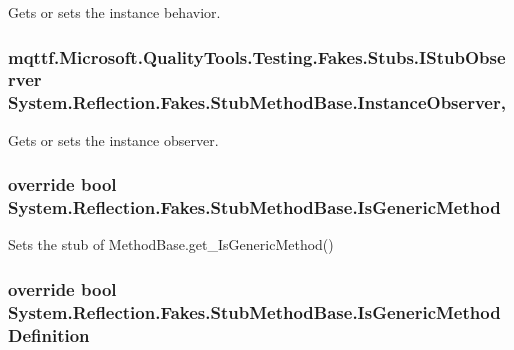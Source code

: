 Gets or sets the instance behavior.

\hypertarget{class_system_1_1_reflection_1_1_fakes_1_1_stub_method_base_a9e28b2aeb90b5c9c6df565e5b5fa22e6}{
\subsubsection[{Instance\-Observer}]{\setlength{\rightskip}{0pt plus 5cm}mqttf.\-Microsoft.\-Quality\-Tools.\-Testing.\-Fakes.\-Stubs.\-I\-Stub\-Observer System.\-Reflection.\-Fakes.\-Stub\-Method\-Base.\-Instance\-Observer\hspace{0.3cm}{\ttfamily [get]}, {\ttfamily [set]}}}\label{class_system_1_1_reflection_1_1_fakes_1_1_stub_method_base_a9e28b2aeb90b5c9c6df565e5b5fa22e6}


Gets or sets the instance observer.

\hypertarget{class_system_1_1_reflection_1_1_fakes_1_1_stub_method_base_aa01f57ba6382d6aca5e79fa6ad302a6d}{
\subsubsection[{Is\-Generic\-Method}]{\setlength{\rightskip}{0pt plus 5cm}override bool System.\-Reflection.\-Fakes.\-Stub\-Method\-Base.\-Is\-Generic\-Method\hspace{0.3cm}{\ttfamily [get]}}}\label{class_system_1_1_reflection_1_1_fakes_1_1_stub_method_base_aa01f57ba6382d6aca5e79fa6ad302a6d}


Sets the stub of Method\-Base.\-get\-\_\-\-Is\-Generic\-Method()

\hypertarget{class_system_1_1_reflection_1_1_fakes_1_1_stub_method_base_a8fa506c5f641e7559d1eb096b0a7fcf7}{
\subsubsection[{Is\-Generic\-Method\-Definition}]{\setlength{\rightskip}{0pt plus 5cm}override bool System.\-Reflection.\-Fakes.\-Stub\-Method\-Base.\-Is\-Generic\-Method\-Definition\hspace{0.3cm}{\ttfamily [get]}}}\label{class_system_1_1_reflection_1_1_fakes_1_1_stub_method_base_a8fa506c5f641e7559d1eb096b0a7fcf7}


